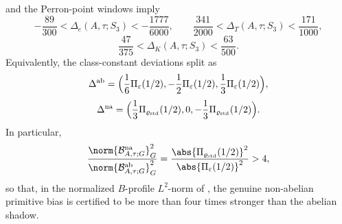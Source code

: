 \begin{corollary}
\begin{equation}
  \end{equation}
  and the Perron-point windows imply
  \begin{equation}\label{eq:s3-example-delta-certified-windows}
    -\frac{89}{300}
    <\Delta_e(A,\tau;S_3)<-\frac{1777}{6000},
    \qquad
    \frac{341}{2000}
    <\Delta_T(A,\tau;S_3)<\frac{171}{1000},
  \end{equation}
  \begin{equation}\label{eq:s3-example-delta-k-certified-window}
    \frac{47}{375}
    <\Delta_K(A,\tau;S_3)<\frac{63}{500}.
  \end{equation}
  Equivalently, the class-constant deviations split as
  \begin{equation}\label{eq:s3-example-abelian-shadow}
    \Delta^{\mathrm{ab}}
    =
    \Bigl(
      \frac16\Pi_\varepsilon(1/2),
      -\frac12\Pi_\varepsilon(1/2),
      \frac13\Pi_\varepsilon(1/2)
    \Bigr),
  \end{equation}
  \begin{equation}\label{eq:s3-example-nonabelian-defect}
    \Delta^{\mathrm{na}}
    =
    \Bigl(
      \frac13\Pi_{\varrho_{\mathrm{std}}}(1/2),
      0,
      -\frac13\Pi_{\varrho_{\mathrm{std}}}(1/2)
    \Bigr).
  \end{equation}
  In particular,
  \begin{equation}\label{eq:s3-example-energy-ratio}
    \frac{\norm{\mathcal B_{A,\tau;G}^{\mathrm{na}}}_G^2}
         {\norm{\mathcal B_{A,\tau;G}^{\mathrm{ab}}}_G^2}
    =
    \frac{\abs{\Pi_{\varrho_{\mathrm{std}}}(1/2)}^2}
         {\abs{\Pi_\varepsilon(1/2)}^2}
    >4,
  \end{equation}
  so that, in the normalized \(B\)-profile \(L^2\)-norm of
  , the genuine non-abelian primitive
  bias is certified to be more than four times stronger than the
  abelian shadow.
\end{corollary}

